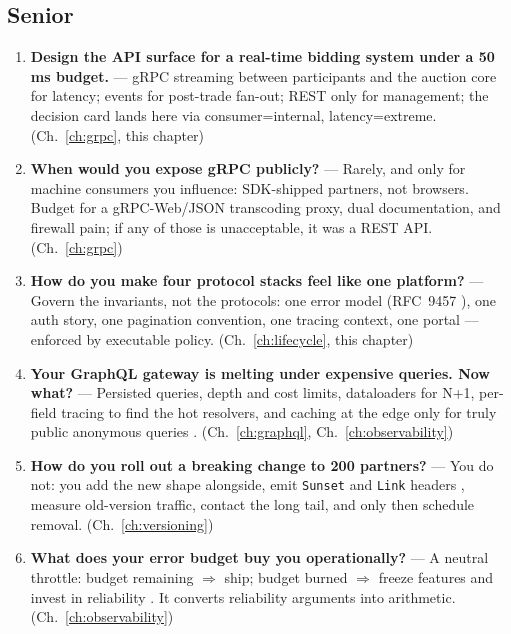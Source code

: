 \subsection*{Senior}

\begin{enumerate}[label=\textbf{Q\arabic*.}, leftmargin=3em, start=17]
  \item \textbf{Design the API surface for a real-time bidding system under
        a 50\,ms budget.} --- gRPC streaming between participants and the
        auction core for latency; events for post-trade fan-out; REST only
        for management; the decision card lands here via consumer=internal,
        latency=extreme. (Ch.~\ref{ch:grpc}, this chapter)
  \item \textbf{When would you expose gRPC publicly?} --- Rarely, and only
        for machine consumers you influence: SDK-shipped partners, not
        browsers. Budget for a gRPC-Web/JSON transcoding proxy, dual
        documentation, and firewall pain; if any of those is unacceptable,
        it was a REST API. (Ch.~\ref{ch:grpc})
  \item \textbf{How do you make four protocol stacks feel like one
        platform?} --- Govern the invariants, not the protocols: one error
        model (RFC~9457 \cite{rfc9457}), one auth story, one pagination
        convention, one tracing context, one portal --- enforced by
        executable policy. (Ch.~\ref{ch:lifecycle}, this chapter)
  \item \textbf{Your GraphQL gateway is melting under expensive queries.
        Now what?} --- Persisted queries, depth and cost limits, dataloaders
        for N+1, per-field tracing to find the hot resolvers, and caching at
        the edge only for truly public anonymous queries \cite{graphqlspec}.
        (Ch.~\ref{ch:graphql}, Ch.~\ref{ch:observability})
  \item \textbf{How do you roll out a breaking change to 200 partners?} ---
        You do not: you add the new shape alongside, emit \texttt{Sunset}
        and \texttt{Link} headers \cite{rfc8594,rfc8288}, measure old-version
        traffic, contact the long tail, and only then schedule removal.
        (Ch.~\ref{ch:versioning})
  \item \textbf{What does your error budget buy you operationally?} --- A
        neutral throttle: budget remaining $\Rightarrow$ ship; budget burned
        $\Rightarrow$ freeze features and invest in reliability
        \cite{beyer2016sre}. It converts reliability arguments into
        arithmetic. (Ch.~\ref{ch:observability})

\end{enumerate}
